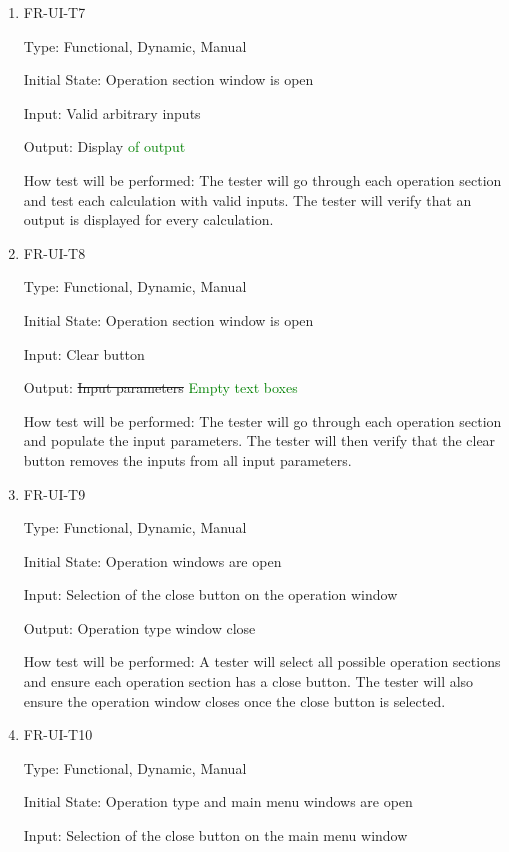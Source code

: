 \documentclass[12pt, titlepage]{article}
\begin{document}
\begin{enumerate}
\item{FR-UI-T7\\}

Type: Functional, Dynamic, Manual
					
Initial State: Operation section window is open
					
Input: Valid arbitrary inputs
					
Output: Display \textcolor{Green}{of output}

How test will be performed: The tester will go through each operation section and test each calculation with valid inputs. The tester will verify that an output is displayed for every calculation.


\item{FR-UI-T8\\}

Type: Functional, Dynamic, Manual
					
Initial State: Operation section window is open
					
Input: Clear button
					
Output: \sout{Input parameters} \textcolor{Green}{Empty text boxes}

How test will be performed: The tester will go through each operation section and populate the input parameters. The tester will then verify that the clear button removes the inputs from all input parameters.

\item{FR-UI-T9\\}

Type: Functional, Dynamic, Manual
					
Initial State: Operation windows are open
					
Input: Selection of the close button on the operation window
					
Output: Operation type window close
					
How test will be performed: A tester will select all possible operation sections and ensure each operation section has a close button. The tester will also ensure the operation window closes once the close button is selected.

\item{FR-UI-T10\\}

Type: Functional, Dynamic, Manual
					
Initial State: Operation type and main menu windows are open
					
Input: Selection of the close button on the main menu window 
					

\end{enumerate}
\end{document}

